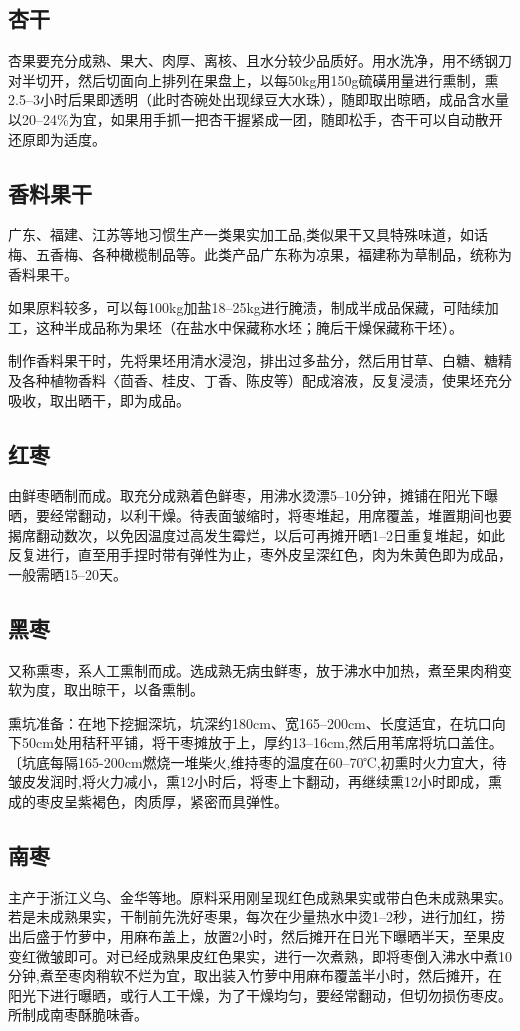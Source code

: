 \documentclass{ctexbook}
\begin{document}
\subsection{杏干}
杏果要充分成熟、果大、肉厚、离核、且水分较少品质好。用水洗净，用不绣钢刀对半切开，然后切面向上排列在果盘上，以每50kg用150g硫磺用量进行熏制，熏2.5--3小时后果即透明（此时杏碗处出现绿豆大水珠），随即取出晾晒，成品含水量以20--24\%为宜，如果用手抓一把杏干握紧成一团，随即松手，杏干可以自动散开还原即为适度。
\subsection{香料果干}
广东、福建、江苏等地习惯生产一类果实加工品,类似果干又具特殊味道，如话梅、五香梅、各种橄榄制品等。此类产品广东称为凉果，福建称为草制品，统称为香料果干。

如果原料较多，可以每100kg加盐18--25kg进行腌渍，制成半成品保藏，可陆续加工，这种半成品称为果坯（在盐水中保藏称水坯；腌后干燥保藏称干坯）。

制作香料果干时，先将果坯用清水浸泡，排出过多盐分，然后用甘草、白糖、糖精及各种植物香料〈茴香、桂皮、丁香、陈皮等）配成溶液，反复浸渍，使果坯充分吸收，取出晒干，即为成品。
\subsection{红枣}
由鲜枣晒制而成。取充分成熟着色鲜枣，用沸水烫漂5--10分钟，摊铺在阳光下曝晒，要经常翻动，以利干燥。待表面皱缩时，将枣堆起，用席覆盖，堆置期间也要揭席翻动数次，以免因温度过高发生霉烂，以后可再摊开晒1--2日重复堆起，如此反复进行，直至用手捏时带有弹性为止，枣外皮呈深红色，肉为朱黄色即为成品，一般需晒15--20天。
\subsection{黑枣}
又称熏枣，系人工熏制而成。选成熟无病虫鲜枣，放于沸水中加热，煮至果肉稍变软为度，取出晾干，以备熏制。

熏坑准备：在地下挖掘深坑，坑深约180cm、宽165--200cm、长度适宜，在坑口向下50cm处用秸秆平铺，将干枣摊放于上，厚约13--16cm,然后用苇席将坑口盖住。〔坑底每隔165-200cm燃烧一堆柴火,维持枣的温度在60--70℃,初熏时火力宜大，待皱皮发润时,将火力减小，熏12小时后，将枣上卞翻动，再继续熏12小时即成，熏成的枣皮呈紫褐色，肉质厚，紧密而具弹性。
\subsection{南枣}
主产于浙江义乌、金华等地。原料采用刚呈现红色成熟果实或带白色未成熟果实。若是未成熟果实，干制前先洗好枣果，每次在少量热水中烫1--2秒，进行加红，捞出后盛于竹萝中，用麻布盖上，放置2小时，然后摊开在日光下曝晒半天，至果皮变红微皱即可。对已经成熟果皮红色果实，进行一次煮熟，即将枣倒入沸水中煮10分钟,煮至枣肉稍软不烂为宜，取出装入竹萝中用麻布覆盖半小时，然后摊开，在阳光下进行曝晒，或行人工干燥，为了干燥均匀，要经常翻动，但切勿损伤枣皮。所制成南枣酥脆味香。
\end{document}
